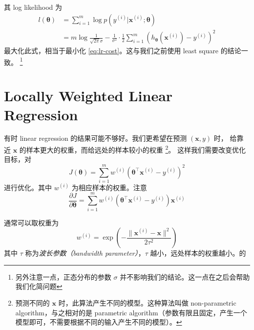		其 log likelihood 为 
		\begin{align*}
			l(\bm{\theta}) &= \sum_{i=1}^{m} \log p(y^{(i)} | \bm{x}^{(i)}; \bm{\theta}) \\
			&= m\log \frac{1}{\sqrt{2\pi}\sigma} - \frac{1}{\sigma^2} \cdot \frac{1}{2} \sum_{i=1}^{m} \left( h_{\bm{\theta}}(\bm{x}^{(i)}) - y^{(i)} \right)^2
		\end{align*}
		最大化此式，相当于最小化 \eqref{eq:lr-cost}。这与我们之前使用 least square 的结论一致。
		\footnote{另外注意一点，正态分布的参数 $ \sigma $ 并不影响我们的结论。这一点在之后会帮助我们化简问题}
		
	\section{Locally Weighted Linear Regression}
		有时 linear regression 的结果可能不够好。我们更希望在预测 $ (\bm{x}, y) $ 时，
		给靠近 $ \bm{x} $ 的样本更大的权重，而给远处的样本较小的权重
		\footnote{预测不同的 $ \bm{x} $ 时，此算法产生不同的模型。这种算法叫做 non-parametric algorithm，与之相对的是 parametric algorithm（参数有限且固定，产生一个模型即可，不需要根据不同的输入产生不同的模型）。}。
		这样我们需要改变优化目标，对 
		\begin{equation}
			J(\bm{\theta}) = \sum_{i=1}^{m} w^{(i)} (\bm{\theta}^\intercal \bm{x}^{(i)} - y^{(i)})^2
		\end{equation}
		进行优化。其中 $ w^{(i)} $ 为相应样本的权重。注意
		\begin{equation}
			\frac{\partial J}{\partial \bm{\theta}} = \sum_{i=1}^{m} w^{(i)} (\bm{\theta}^\intercal \bm{x}^{(i)} - y^{(i)}) \bm{x}^{(i)}
		\end{equation}
		
		通常可以取权重为
		\begin{equation}
			w^{(i)} = \exp \left( - \frac{ \| \bm{x}^{(i)} - \bm{x} \|^2 }{2\tau ^2} \right)
		\end{equation}
		其中 $ \tau $ 称为\emph{波长参数（bandwidth parameter）}，$ \tau $ 越小，远处样本的权重越小。的
